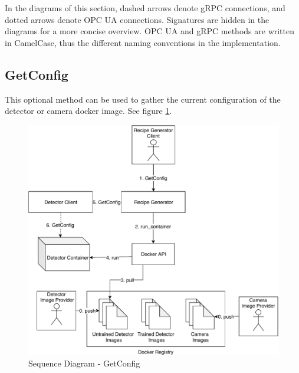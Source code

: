 In the diagrams of this section, dashed arrows denote gRPC connections, and dotted arrows denote OPC UA connections. Signatures are hidden in the diagrams for a more concise overview. OPC UA and gRPC methods are written in CamelCase, thus the different naming conventions in the implementation.

\subsection{GetConfig}\label{subsec:getconfig}
This optional method can be used to gather the current configuration of the detector or camera docker image. See figure \ref{fig:SequenceDiagram-GetConfig}.

\begin{figure}[ht]
	\centering
  \includegraphics[width=\textwidth]{img/SequenceDiagram-GetConfig.pdf}
	\caption{Sequence Diagram - GetConfig}
	\label{fig:SequenceDiagram-GetConfig}
\end{figure}

